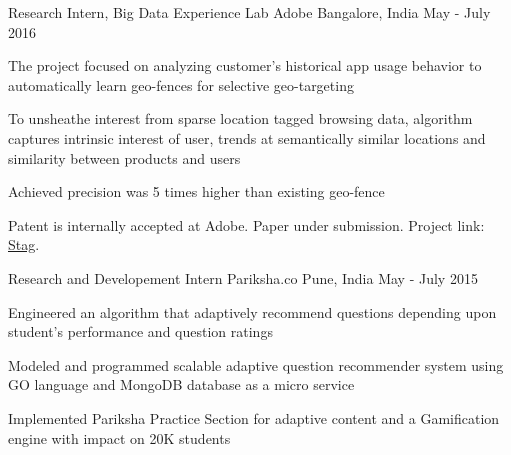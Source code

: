

\begin{cventries}

  \cventry
    {Research Intern, Big Data Experience Lab} %
    {Adobe} %
    {Bangalore, India} %
    {May - July 2016} %
    {
      \begin{cvitems} %
        \item {The project focused on analyzing customer’s historical app usage behavior to automatically learn geo-fences for selective geo-targeting}
        \item { To unsheathe interest from sparse location tagged browsing data, algorithm captures intrinsic interest of user, trends at semantically similar locations and similarity between products and users}
        \item Achieved precision was 5 times higher than existing geo-fence
        \item Patent is internally accepted at Adobe. Paper under submission. Project link:  \href{https://research.adobe.com/project/smart-geo-fencing/}{Stag}. 
      \end{cvitems}
    }

  \cventry
    {Research and Developement Intern} %
    {Pariksha.co} %
    {Pune, India} %
    {May - July 2015} %
    {
      \begin{cvitems} 
      	\item {Engineered an algorithm that adaptively recommend questions depending upon student’s performance and question ratings}
      	\item {Modeled and programmed scalable adaptive question recommender system using GO language and MongoDB database as a micro service}
      	\item {Implemented Pariksha Practice Section for adaptive content and a Gamification engine with impact on 20K students}
      \end{cvitems}
    }
\end{cventries}
